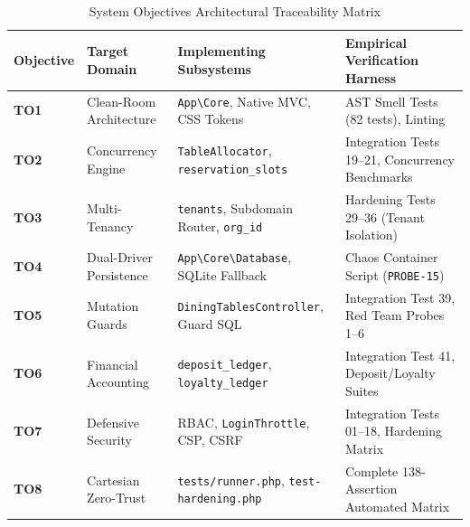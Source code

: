 \begin{table}[htbp]
\centering
\caption{System Objectives Architectural Traceability Matrix}
\label{tab:objectives_traceability}
\small
\begin{tabularx}{\textwidth}{llp{4.2cm}X}
\toprule
\textbf{Objective} & \textbf{Target Domain} & \textbf{Implementing Subsystems} & \textbf{Empirical Verification Harness} \\
\midrule
\textbf{TO1} & Clean-Room Architecture & \texttt{App\textbackslash Core}, Native MVC, CSS Tokens & AST Smell Tests (82 tests), Linting \\
\textbf{TO2} & Concurrency Engine & \texttt{TableAllocator}, \texttt{reservation\_slots} & Integration Tests 19--21, Concurrency Benchmarks \\
\textbf{TO3} & Multi-Tenancy & \texttt{tenants}, Subdomain Router, \texttt{org\_id} & Hardening Tests 29--36 (Tenant Isolation) \\
\textbf{TO4} & Dual-Driver Persistence & \texttt{App\textbackslash Core\textbackslash Database}, SQLite Fallback & Chaos Container Script (\texttt{PROBE-15}) \\
\textbf{TO5} & Mutation Guards & \texttt{DiningTablesController}, Guard SQL & Integration Test 39, Red Team Probes 1--6 \\
\textbf{TO6} & Financial Accounting & \texttt{deposit\_ledger}, \texttt{loyalty\_ledger} & Integration Test 41, Deposit/Loyalty Suites \\
\textbf{TO7} & Defensive Security & RBAC, \texttt{LoginThrottle}, CSP, CSRF & Integration Tests 01--18, Hardening Matrix \\
\textbf{TO8} & Cartesian Zero-Trust & \texttt{tests/runner.php}, \texttt{test-hardening.php} & Complete 138-Assertion Automated Matrix \\
\bottomrule
\end{tabularx}
\end{table}
